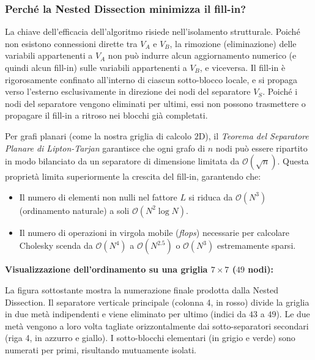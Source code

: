 \documentclass[a4paper,11pt]{article}
\theoremstyle{definition}
\begin{document}
\subsubsection{Perché la Nested Dissection minimizza il fill-in?}

La chiave dell'efficacia dell'algoritmo risiede nell'isolamento strutturale. Poiché non esistono connessioni dirette tra $V_A$ e $V_B$, la rimozione (eliminazione) delle variabili appartenenti a $V_A$ non può indurre alcun aggiornamento numerico (e quindi alcun fill-in) sulle variabili appartenenti a $V_B$, e viceversa. Il fill-in è rigorosamente confinato all'interno di ciascun sotto-blocco locale, e si propaga verso l'esterno esclusivamente in direzione dei nodi del separatore $V_S$. Poiché i nodi del separatore vengono eliminati per ultimi, essi non possono trasmettere o propagare il fill-in a ritroso nei blocchi già completati.

Per grafi planari (come la nostra griglia di calcolo $2\text{D}$), il \emph{Teorema del Separatore Planare di Lipton-Tarjan} garantisce che ogni grafo di $n$ nodi può essere ripartito in modo bilanciato da un separatore di dimensione limitata da $\mathcal{O}(\sqrt{n})$. Questa proprietà limita superiormente la crescita del fill-in, garantendo che:
\begin{itemize}
  \item Il numero di elementi non nulli nel fattore $L$ si riduca da $\mathcal{O}(N^3)$ (ordinamento naturale) a soli $\mathcal{O}(N^2 \log N)$.
  \item Il numero di operazioni in virgola mobile (\emph{flops}) necessarie per calcolare Cholesky scenda da $\mathcal{O}(N^4)$ a $\mathcal{O}(N^{2.5})$ o $\mathcal{O}(N^3)$ estremamente sparsi.
\end{itemize}

\bigskip
\noindent\textbf{Visualizzazione dell'ordinamento su una griglia $7 \times 7$ ($49$ nodi):}

La figura sottostante mostra la numerazione finale prodotta dalla Nested Dissection. Il separatore verticale principale (colonna 4, in rosso) divide la griglia in due metà indipendenti e viene eliminato per ultimo (indici da $43$ a $49$). Le due metà vengono a loro volta tagliate orizzontalmente dai sotto-separatori secondari (riga 4, in azzurro e giallo). I sotto-blocchi elementari (in grigio e verde) sono numerati per primi, risultando mutuamente isolati.
\end{document}
